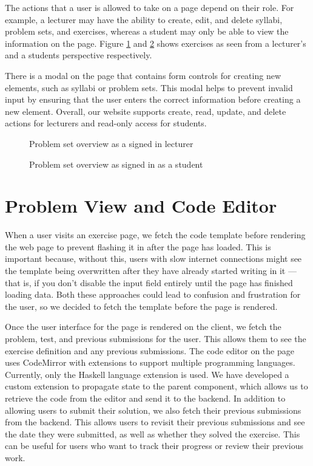 The actions that a user is allowed to take on a page depend on their role. For example, a lecturer may have the ability to create, edit, and delete syllabi, problem sets, and exercises, whereas a student may only be able to view the information on the page.
Figure \ref{fig:problemsets_teacher_view} and \ref{fig:exercise_overview} shows exercises as seen from a lecturer's and a students perspective respectively.

There is a modal on the page that contains form controls for creating new elements, such as syllabi or problem sets.
This modal helps to prevent invalid input by ensuring that the user enters the correct information before creating a new element.
Overall, our website supports create, read, update, and delete actions for lecturers and read-only access for students.

\begin{figure}[H]
    \centering
    \caption{Problem set overview as a signed in lecturer}
    \label{fig:problemsets_teacher_view}
\end{figure}

\begin{figure}[H]
    \centering
    \caption{Problem set overview as signed in as a student}
    \label{fig:exercise_overview}
\end{figure}

\section{Problem View and Code Editor}
When a user visits an exercise page, we fetch the code template before rendering the web page to prevent flashing it in after the page has loaded.
This is important because, without this, users with slow internet connections might see the template being overwritten after they have already started writing in it --- that is, if you don't disable the input field entirely until the page has finished loading data. Both these approaches could lead to confusion and frustration for the user, so we decided to fetch the template before the page is rendered.

Once the user interface for the page is rendered on the client, we fetch the problem, test, and previous submissions for the user.
This allows them to see the exercise definition and any previous submissions.
The code editor on the page uses CodeMirror with extensions to support multiple programming languages.
Currently, only the Haskell language extension is used.
We have developed a custom extension to propagate state to the parent component, which allows us to retrieve the code from the editor and send it to the backend.
In addition to allowing users to submit their solution, we also fetch their previous submissions from the backend.
This allows users to revisit their previous submissions and see the date they were submitted, as well as whether they solved the exercise.
This can be useful for users who want to track their progress or review their previous work.

